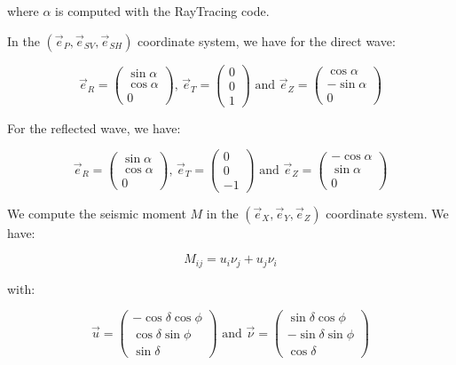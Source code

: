 \documentclass[main.tex]{subfiles}
\begin{document}
where $\alpha$ is computed with the RayTracing code.

In the $(\vec{e}_P, \vec{e}_{SV}, \vec{e}_{SH})$ coordinate system, we have for the direct wave:

\begin{equation}
\vec{e}_R = \begin{pmatrix}
\sin \alpha \\
\cos \alpha \\
0
\end{pmatrix} \text{, } \vec{e}_T = \begin{pmatrix}
0 \\
0 \\
1
\end{pmatrix} \text{ and } \vec{e}_Z = \begin{pmatrix}
\cos \alpha \\
- \sin \alpha \\
0
\end{pmatrix}
\end{equation}

For the reflected wave, we have:

\begin{equation}
\vec{e}_R = \begin{pmatrix}
\sin \alpha \\
\cos \alpha \\
0
\end{pmatrix} \text{, } \vec{e}_T = \begin{pmatrix}
0 \\
0 \\
- 1
\end{pmatrix} \text{ and } \vec{e}_Z = \begin{pmatrix}
- \cos \alpha \\
\sin \alpha \\
0
\end{pmatrix}
\end{equation}

We compute the seismic moment $M$ in the $(\vec{e}_X, \vec{e}_Y, \vec{e}_Z)$ coordinate system. We have:

\begin{equation}
M_{ij} = u_i \nu_j + u_j \nu_i
\end{equation}

with:

\begin{equation}
\vec{u} = \begin{pmatrix}
- \cos \delta \cos \phi \\
\cos \delta \sin \phi \\
\sin \delta
\end{pmatrix} \text{ and } \vec{\nu} = \begin{pmatrix}
\sin \delta \cos \phi \\
- \sin \delta \sin \phi \\
\cos \delta 
\end{pmatrix}
\end{equation}
\end{document}
